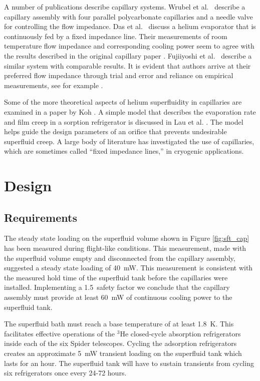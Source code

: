 \documentclass[
12pt, %
letterpaper, %
oneside, %
headinclude, footinclude, %
BCOR5mm, %
]{scrartcl}
\newcommand{\hee}{$^3\mathrm{He}$ }
\newcommand{\spider}{{\sc Spider} }
\begin{document}
A number of publications describe capillary systems. Wrubel et al.\ \cite{Wrubel2011} describe a capillary assembly with four parallel polycarbonate capillaries and a needle valve for controlling the flow impedance. Das et al.\ \cite{Das2012} discuss a helium evaporator that is continuously fed by a fixed impedance line. Their measurements of room temperature flow impedance and corresponding cooling power seem to agree with  the results described in the original capillary paper \cite{Delong1970}. Fujiiyoshi et al.\  \cite{Fujiyoshi1991} describe a similar system with comparable results. It is evident that authors arrive at their preferred flow impedance through trial and error and reliance on empirical measurements, see for example \cite{Talpe1988,Singsaas1984}.

Some of the more theoretical aspects of helium superfluidity in capillaries are examined in a paper by Koh \cite{Koh2008}. A simple model that describes the evaporation rate and film creep in a sorption refrigerator is discussed in Lau et al. \cite{Lau2006}. The model helps guide the design parameters of an orifice that prevents undesirable superfluid creep. A large body of literature has investigated the use of capillaries, which are sometimes called \enquote{fixed impedance lines,} in cryogenic applications.

\section{Design}

\subsection{Requirements}
The steady state loading on the superfluid volume shown in Figure
\ref{fig:sft_cap} has been measured during flight-like
conditions. This measurement, made with the superfluid volume empty
and disconnected from the capillary assembly, suggested a steady state
loading of 40~mW. This measurement is consistent with the measured
hold time of the superfluid tank before the capillaries were
installed. Implementing a 1.5~safety factor we conclude that the
capillary assembly must provide at least 60~mW of continuous cooling
power to the superfluid tank.

The superfluid bath must reach a base temperature of at least 1.8~K. This facilitates effective operations of the \hee closed-cycle absorption refrigerators inside each of the six \spider telescopes. Cycling the adsorption refrigerators creates an approximate 5~mW transient loading on the superfluid tank which lasts for an hour. The superfluid tank will have to sustain transients from cycling six refrigerators once every 24-72 hours.
\end{document}
